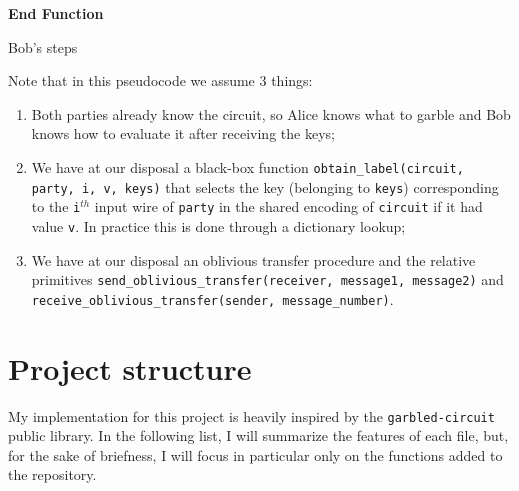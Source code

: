 \documentclass[12pt]{article}
\begin{document}
\begin{algorithm}[H]
  \SetAlgoLined
    \textbf{End Function}
   \caption{Bob's steps}\label{alg:bob}
\end{algorithm}

Note that in this pseudocode we assume 3 things:

\begin{enumerate}
  \item Both parties already know the circuit, so Alice knows what to garble and Bob knows how to evaluate it after receiving the keys;
  \item We have at our disposal a black-box function \texttt{obtain\_label(circuit, party, i, v, keys)} that selects the key (belonging to \texttt{keys}) corresponding to the \texttt{i}$^{th}$ input wire of \texttt{party} in the shared encoding of \texttt{circuit} if it had value \texttt{v}. In practice this is done through a dictionary lookup;
  \item We have at our disposal an oblivious transfer procedure and the relative primitives \texttt{send\_oblivious\_transfer(receiver, message1, message2)} and \\\texttt{receive\_oblivious\_transfer(sender, message\_number)}.
\end{enumerate}

\section{Project structure}
My implementation for this project is heavily inspired by the \texttt{garbled-circuit} \cite{GARBLED} public library. In the following list, I will summarize the features of each file, but, for the sake of briefness, I will focus in particular only on the functions added to the repository.
\end{document}
